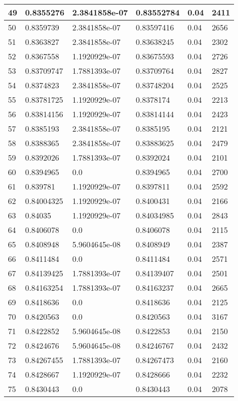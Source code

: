 \begin{longtable}{|l|l|l|l|l|l|}
49 & 0.8355276 & 2.3841858e-07 & 0.83552784 & 0.04 & 2411 \\ \hline 
50 & 0.8359739 & 2.3841858e-07 & 0.83597416 & 0.04 & 2656 \\ \hline 
51 & 0.8363827 & 2.3841858e-07 & 0.83638245 & 0.04 & 2302 \\ \hline 
52 & 0.8367558 & 1.1920929e-07 & 0.83675593 & 0.04 & 2726 \\ \hline 
53 & 0.83709747 & 1.7881393e-07 & 0.83709764 & 0.04 & 2827 \\ \hline 
54 & 0.8374823 & 2.3841858e-07 & 0.83748204 & 0.04 & 2525 \\ \hline 
55 & 0.83781725 & 1.1920929e-07 & 0.8378174 & 0.04 & 2213 \\ \hline 
56 & 0.83814156 & 1.1920929e-07 & 0.83814144 & 0.04 & 2423 \\ \hline 
57 & 0.8385193 & 2.3841858e-07 & 0.8385195 & 0.04 & 2121 \\ \hline 
58 & 0.8388365 & 2.3841858e-07 & 0.83883625 & 0.04 & 2479 \\ \hline 
59 & 0.8392026 & 1.7881393e-07 & 0.8392024 & 0.04 & 2101 \\ \hline 
60 & 0.8394965 & 0.0 & 0.8394965 & 0.04 & 2700 \\ \hline 
61 & 0.839781 & 1.1920929e-07 & 0.8397811 & 0.04 & 2592 \\ \hline 
62 & 0.84004325 & 1.1920929e-07 & 0.8400431 & 0.04 & 2166 \\ \hline 
63 & 0.84035 & 1.1920929e-07 & 0.84034985 & 0.04 & 2843 \\ \hline 
64 & 0.8406078 & 0.0 & 0.8406078 & 0.04 & 2115 \\ \hline 
65 & 0.8408948 & 5.9604645e-08 & 0.8408949 & 0.04 & 2387 \\ \hline 
66 & 0.8411484 & 0.0 & 0.8411484 & 0.04 & 2571 \\ \hline 
67 & 0.84139425 & 1.7881393e-07 & 0.84139407 & 0.04 & 2501 \\ \hline 
68 & 0.84163254 & 1.7881393e-07 & 0.84163237 & 0.04 & 2665 \\ \hline 
69 & 0.8418636 & 0.0 & 0.8418636 & 0.04 & 2125 \\ \hline 
70 & 0.8420563 & 0.0 & 0.8420563 & 0.04 & 3167 \\ \hline 
71 & 0.8422852 & 5.9604645e-08 & 0.8422853 & 0.04 & 2150 \\ \hline 
72 & 0.8424676 & 5.9604645e-08 & 0.84246767 & 0.04 & 2432 \\ \hline 
73 & 0.84267455 & 1.7881393e-07 & 0.84267473 & 0.04 & 2160 \\ \hline 
74 & 0.8428667 & 1.1920929e-07 & 0.8428666 & 0.04 & 2232 \\ \hline 
75 & 0.8430443 & 0.0 & 0.8430443 & 0.04 & 2078 \\ \hline 
\end{longtable}